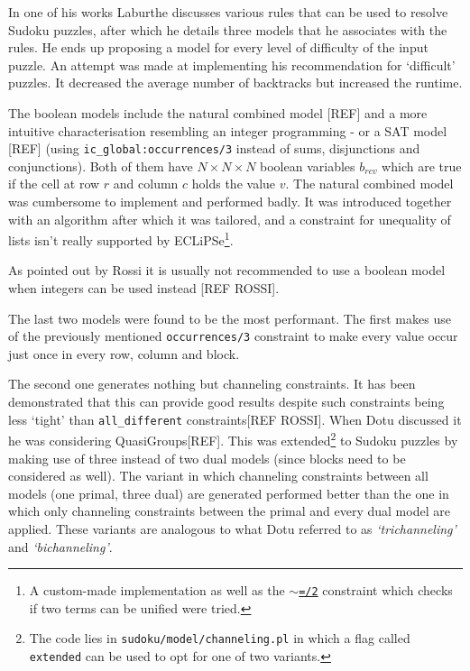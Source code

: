 In one of his works Laburthe discusses various rules that can be used to resolve Sudoku puzzles, after which he details three models that he associates with the rules. He ends up proposing a model for every level of difficulty of the input puzzle. An attempt was made at implementing his recommendation for `difficult' puzzles. It decreased the average number of backtracks but increased the runtime. \\\par

The boolean models include the natural combined model [REF] and a more intuitive characterisation resembling an integer programming - or a SAT model [REF] (using \texttt{ic\_global:occurrences/3} instead of sums, disjunctions and conjunctions). Both of them have $N\times N\times N$ boolean variables $b_{rcv}$ which are true if the cell at row $r$ and column $c$ holds the value $v$. The natural combined model was cumbersome to implement and performed badly. It was introduced together with an algorithm after which it was tailored, and a constraint for unequality of lists isn't really supported by ECLiPSe\footnote{A custom-made implementation as well as the \href{https://eclipseclp.org/doc/bips/kernel/termcomp/TE-2.html}{\texttt{$\sim$=/2}} constraint which checks if two terms can be unified were tried.}.\par
As pointed out by Rossi it is usually not recommended to use a boolean model when integers can be used instead [REF ROSSI].\\\par

The last two models were found to be the most performant. The first makes use of the previously mentioned \texttt{occurrences/3} constraint to make every value occur just once in every row, column and block. 
\par The second one generates nothing but channeling constraints. It has been demonstrated that this can provide good results despite such constraints being less `tight' than \texttt{all\_different} constraints[REF ROSSI]. When Dotu discussed it he was considering QuasiGroups[REF]. This was extended\footnote{The code lies in \texttt{sudoku/model/channeling.pl} in which a flag called \texttt{extended} can be used to opt for one of two variants.} to Sudoku puzzles by making use of three instead of two dual models (since blocks need to be considered as well). The variant in which channeling constraints between all models (one primal, three dual) are generated performed better than the one in which only channeling constraints between the primal and every dual model are applied. These variants are analogous to what Dotu referred to as \textit{`trichanneling'} and \textit{`bichanneling'}.\\\par

